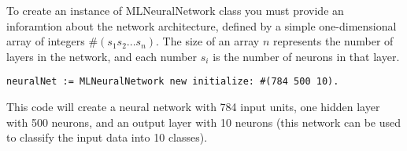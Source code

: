 To create an instance of MLNeuralNetwork class you must provide an inforamtion about the network architecture, defined by a simple one-dimensional array of integers $\#(s_{1} s_{2} ... s_{n})$. The size of an array $n$ represents the number of layers in the network, and each number $s_{i}$ is the number of neurons in that layer.

\begin{lstlisting}
neuralNet := MLNeuralNetwork new initialize: #(784 500 10).
\end{lstlisting}

This code will create a neural network with 784 input units, one hidden layer with 500 neurons, and an output layer with 10 neurons (this network can be used to classify the input data into 10 classes).
